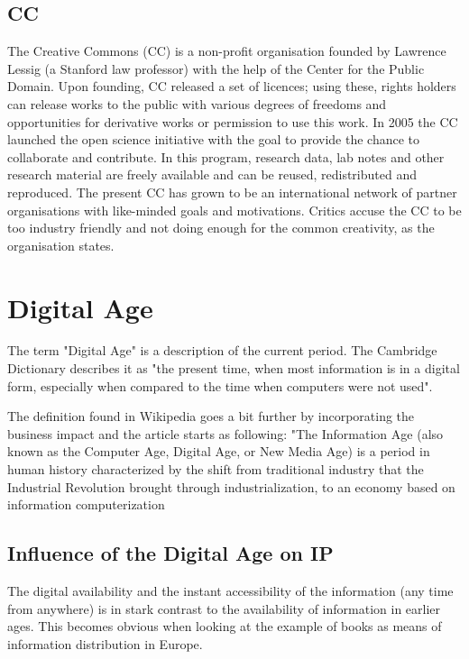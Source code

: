 \documentclass[a4paper]{report}
\begin{document}
\subsection{CC}
\label{sec:CC}
The Creative Commons (CC) is a non-profit organisation founded by Lawrence Lessig (a Stanford law professor) with the help of the Center for the Public Domain. Upon founding, CC released a set of licences; using these, rights holders can release works to the public with various degrees of freedoms and opportunities for derivative works or permission to use this work.
In 2005 the CC launched the open science initiative with the goal to provide the chance to collaborate and contribute. In this program, research data, lab notes and other research material are freely available and can be reused, redistributed and reproduced.
The present CC has grown to be an international network of partner organisations with like-minded goals and motivations. \parencite{Plotkin2002} \parencite{CC2016}
Critics accuse the CC to be too industry friendly and not doing enough for the common creativity, as the organisation states. \parencite{Berry2005}

\section{Digital Age}
\label{sec:Digital age}
The term "Digital Age" is a description of the current period. The Cambridge Dictionary describes it as "the present time, when most information is in a digital form, especially when compared to the time when computers were not used". \parencite{CambridgeUniversityPress2014}
 
The definition found in Wikipedia goes a bit further by incorporating the business impact and the article starts as following: "The Information Age (also known as the Computer Age, Digital Age, or New Media Age) is a period in human history characterized by the shift from traditional industry that the Industrial Revolution brought through industrialization, to an economy based on information computerization \parencite{WikiInfoAge2017}
   
\subsection{Influence of the Digital Age on IP}
The digital availability and the instant accessibility of the information (any time from anywhere) is in stark contrast to the availability of information in earlier ages. This becomes obvious when looking at the example of books as means of information distribution in Europe.
\end{document}
